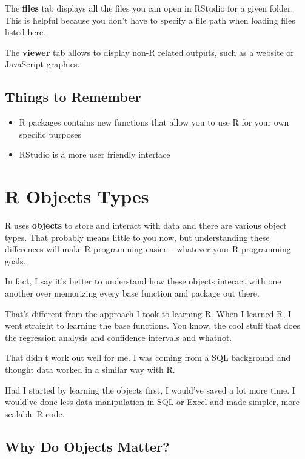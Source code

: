 \documentclass[
]{book}
\providecommand{\tightlist}{%
  \setlength{\itemsep}{0pt}\setlength{\parskip}{0pt}}
\begin{document}
The \textbf{files} tab displays all the files you can open in RStudio for a given folder. This is helpful because you don't have to specify a file path when loading files listed here.

The \textbf{viewer} tab allows to display non-R related outputs, such as a website or JavaScript graphics.

\hypertarget{things-to-remember-1}{%
\section{Things to Remember}\label{things-to-remember-1}}

\begin{itemize}
\tightlist
\item
  R packages contains new functions that allow you to use R for your own specific purposes
\item
  RStudio is a more user friendly interface
\end{itemize}

\hypertarget{objects}{%
\chapter{R Objects Types}\label{objects}}

R uses \textbf{objects} to store and interact with data and there are various object types. That probably means little to you now, but understanding these differences will make R programming easier -- whatever your R programming goals.

In fact, I say it's better to understand how these objects interact with one another over memorizing every base function and package out there.

That's different from the approach I took to learning R. When I learned R, I went straight to learning the base functions. You know, the cool stuff that does the regression analysis and confidence intervals and whatnot.

That didn't work out well for me. I was coming from a SQL background and thought data worked in a similar way with R.

Had I started by learning the objects first, I would've saved a lot more time. I would've done less data manipulation in SQL or Excel and made simpler, more scalable R code.

\hypertarget{why-do-objects-matter}{%
\section{Why Do Objects Matter?}\label{why-do-objects-matter}}
\end{document}
